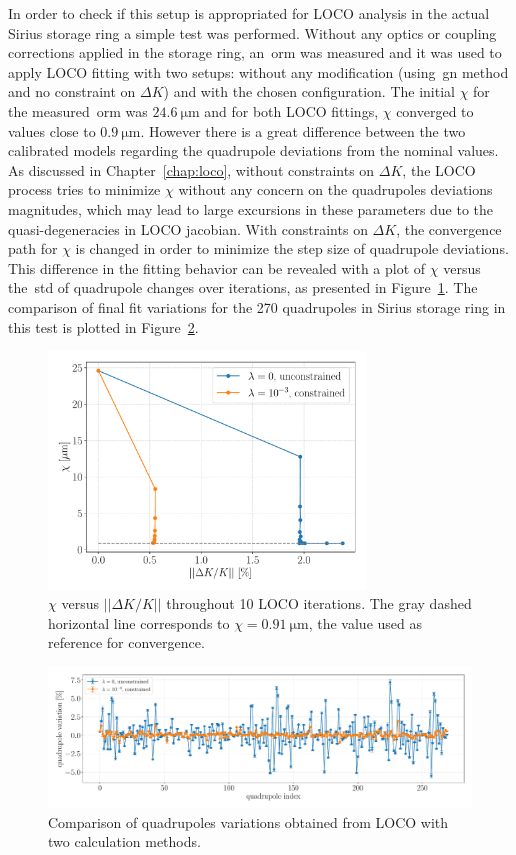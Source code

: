 In order to check if this setup is appropriated for LOCO analysis in the actual Sirius storage ring a simple test was performed. Without any optics or coupling corrections applied in the storage ring, an~\gls{orm} was measured and it was used to apply LOCO fitting with two setups: without any modification (using~\gls{gn} method and no constraint on $\Delta K$) and with the chosen configuration. The initial $\chi$ for the measured~\gls{orm} was $\SI{24.6}{\micro\meter}$ and for both LOCO fittings, $\chi$ converged to values close to $\SI{0.9}{\micro\meter}$. However there is a great difference between the two calibrated models regarding the quadrupole deviations from the nominal values. As discussed in Chapter~\ref{chap:loco}, without constraints on $\Delta K$, the LOCO process tries to minimize $\chi$ without any concern on the quadrupoles deviations magnitudes, which may lead to large excursions in these parameters due to the quasi-degeneracies in LOCO jacobian. With constraints on $\Delta K$, the convergence path for $\chi$ is changed in order to minimize the step size of quadrupole deviations. This difference in the fitting behavior can be revealed with a plot of $\chi$ versus the~\gls{std} of quadrupole changes over iterations, as presented in Figure~\ref{fig:chi_vs_dkl}. The comparison of final fit variations for the 270 quadrupoles in Sirius storage ring in this test is plotted in Figure~\ref{fig:dkl_compare}. 
\begin{figure}
\centering
\includegraphics[width=0.75\textwidth]{figures/chi_versus_dk_cumsum.pdf}
\caption{$\chi$ versus $||\Delta K/K||$ throughout 10 LOCO iterations. The gray dashed horizontal line corresponds to $\chi = \SI{0.91}{\micro\meter}$, the value used as reference for convergence.}
\label{fig:chi_vs_dkl}
\end{figure}
\begin{figure}
\centering
\includegraphics[width=1.0\textwidth]{figures/delta_kl_comparison_better_grid.pdf}
\caption{Comparison of quadrupoles variations obtained from LOCO with two calculation methods.}
\label{fig:dkl_compare}
\end{figure}

